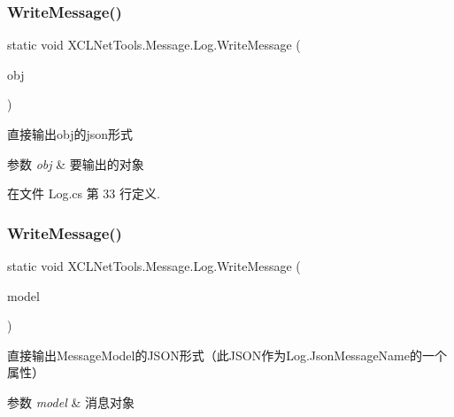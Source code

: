 \subsubsection{\texorpdfstring{Write\+Message()}{WriteMessage()}\hspace{0.1cm}{\footnotesize\ttfamily [1/3]}}
{\footnotesize\ttfamily static void X\+C\+L\+Net\+Tools.\+Message.\+Log.\+Write\+Message (\begin{DoxyParamCaption}\item[{object}]{obj }\end{DoxyParamCaption})\hspace{0.3cm}{\ttfamily [static]}}



直接输出obj的json形式 


\begin{DoxyParams}{参数}
{\em obj} & 要输出的对象\\
\hline
\end{DoxyParams}


在文件 Log.\+cs 第 33 行定义.

\mbox{\label{class_x_c_l_net_tools_1_1_message_1_1_log_a6038d85fedb63a3fe5dc306f1bf30011}} 
\subsubsection{\texorpdfstring{Write\+Message()}{WriteMessage()}\hspace{0.1cm}{\footnotesize\ttfamily [2/3]}}
{\footnotesize\ttfamily static void X\+C\+L\+Net\+Tools.\+Message.\+Log.\+Write\+Message (\begin{DoxyParamCaption}\item[{\hyperlink{class_x_c_l_net_tools_1_1_message_1_1_message_model}{Message\+Model}}]{model }\end{DoxyParamCaption})\hspace{0.3cm}{\ttfamily [static]}}



直接输出\+Message\+Model的\+J\+S\+O\+N形式（此\+J\+S\+O\+N作为\+Log.\+Json\+Message\+Name的一个属性） 


\begin{DoxyParams}{参数}
{\em model} & 消息对象\\
\hline
\end{DoxyParams}


